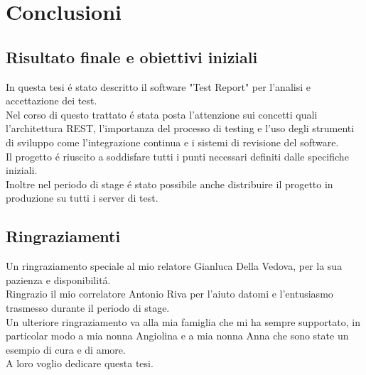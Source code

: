 \chapter{Conclusioni}
    \section{Risultato finale e obiettivi iniziali}
    In questa tesi \'e stato descritto il software "Test Report" per l'analisi e accettazione dei test.\\
    Nel corso di questo trattato \'e stata posta l'attenzione sui concetti quali l'architettura REST, l'importanza del processo di testing e l'uso degli strumenti di sviluppo come l'integrazione continua e i sistemi di revisione del software.\\

    Il progetto \'e riuscito a soddisfare tutti i punti necessari definiti dalle specifiche iniziali.\\
    Inoltre nel periodo di stage \'e stato possibile anche distribuire il progetto in produzione su tutti i server di test.\\

    \section{Ringraziamenti}
    
    Un ringraziamento speciale al mio relatore Gianluca Della Vedova, per la sua pazienza e disponibilit\'a.\\

    Ringrazio il mio correlatore Antonio Riva per l'aiuto datomi e l'entusiasmo trasmesso durante il periodo di stage.\\

    Un ulteriore ringraziamento va alla mia famiglia che mi ha sempre supportato, in particolar modo a mia nonna Angiolina e a mia nonna Anna che sono state un esempio di cura e di amore.\\
    A loro voglio dedicare questa tesi.\\
